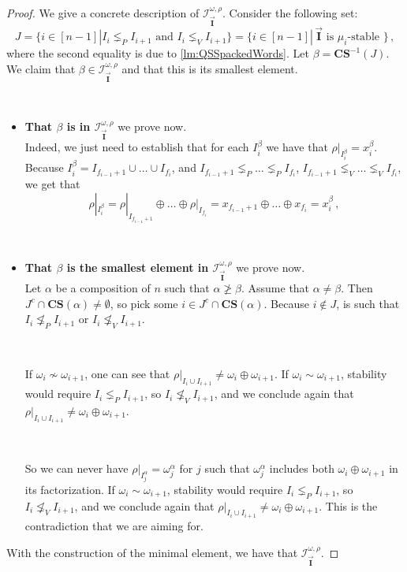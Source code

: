 \documentclass[12pt, reqno]{amsart}
\theoremstyle{definition}
\newcommand{\III}{\vec{\mathbf{I}}}
\begin{document}
\begin{proof}
We give a concrete description of $\mathcal I^{\omega, \rho}_{\III}$.
Consider the following set:
$$J = \{i \in [n-1] | I_i \lneq_P I_{i+1} \text{ and } I_i \lneq_V I_{i+1} \} = \{i \in [n-1] | \, \III \text{ is $\mu_i$-stable } \} \, ,$$
where the second equality is due to \cref{lm:QSSpackedWords}.
Let $\beta = \mathbf{CS}^{-1}( J)$. 
We claim that $\beta \in \mathcal I^{\omega, \rho}_{\III}$ and that this is its smallest element.

\
\begin{itemize}
\item {\bf That $\beta$ is in $\mathcal I^{\omega, \rho}_{\III}$} we prove now.\\
Indeed, we just need to establish that for each $I^{\beta}_i$ we have that $\rho|_{I^{\beta}_i} = x^{\beta}_i$.
Because $I^{\beta}_i = I_{f_{i-1} + 1} \cup \dots \cup I_{f_i}$, and $I_{f_{i-1} + 1} \lneq_P \dots \lneq_P I_{f_i}$, $I_{f_{i-1} + 1} \lneq_V \dots \lneq_V I_{f_i}$, we get that 
$$\rho|_{I^{\beta}_i} = \rho|_{I_{f_{i-1} + 1}} \oplus \dots \oplus \rho|_{I_{f_i}} = x_{f_{i-1} + 1} \oplus \dots\oplus x_{f_i} = x^{\beta}_i\,  ,$$

\

    \item {\bf That $\beta$ is the smallest element in $\mathcal I^{\omega, \rho}_{\III}$} we prove now. \\
Let $\alpha $ be a composition of $n$ such that $\alpha \not \geq \beta$.
Assume that $\alpha \neq \beta$. 
Then $J^c \cap \mathbf{CS}(\alpha)\neq \emptyset $, so pick some $i \in  J^c \cap \mathbf{CS}(\alpha) $.
Because $i \not\in J$, is such that $ I_i \not\lneq_P I_{i+1} \text{ or } I_i \not\lneq_V I_{i+1} $.

\

If $\omega_i \not\sim \omega_{i+1}$, one can see that $\rho|_{I_i \cup I_{i+1}} \neq \omega_i \oplus \omega_{i+1}$.
If $\omega_i \sim \omega_{i+1}$, stability would require $I_i \lneq_P I_{i+1}$, so $I_i \not\lneq_V I_{i+1}$, and we conclude again that $\rho|_{I_i \cup I_{i+1}} \neq \omega_i \oplus \omega_{i+1}$.

\

So we can never have $\rho|_{I^{\alpha}_j} = \omega^{\alpha}_j$ for $j$ such that $\omega^{\alpha}_j$ includes both $\omega_i \oplus \omega_{i+1}$ in its factorization.
If $\omega_i \sim \omega_{i+1}$, stability would require $I_i \lneq_P I_{i+1}$, so $I_i \not\lneq_V I_{i+1}$, and we conclude again that $\rho|_{I_i \cup I_{i+1}} \neq \omega_i \oplus \omega_{i+1}$.
This is the contradiction that we are aiming for.
\end{itemize}
With the construction of the minimal element, we have that $\mathcal I^{\omega, \rho}_{\III}$.
\end{proof}
\end{document}
